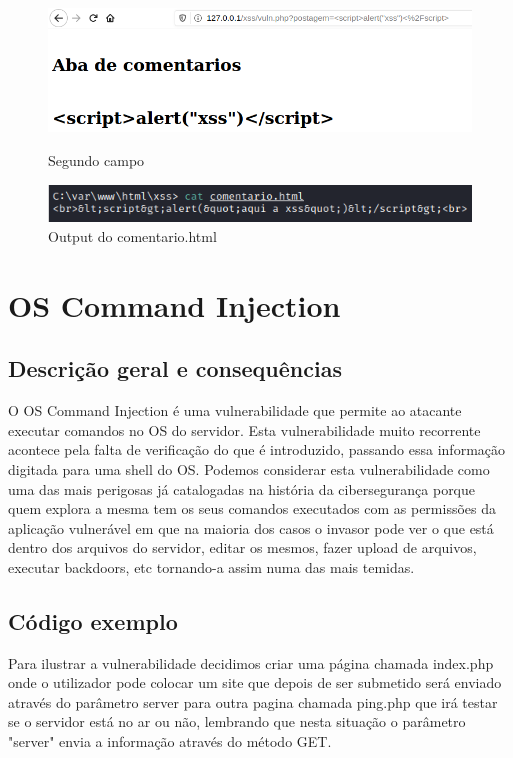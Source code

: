 \documentclass{report}
\begin{document}
\begin{figure}[!htb]
  \includegraphics[width=\linewidth]{imagessql/Fig17.png}
  \caption{Segundo campo}\label{Segundo campo}
\endminipage\hfill
{}
  \includegraphics[width=\linewidth]{imagessql/Fig18.png}
  \caption{Output do comentario.html}\label{Output do comentario.html}
\endminipage
\end{figure}


\clearpage
\section{OS Command Injection}


\subsection{Descrição geral e consequências}

O OS Command Injection é uma vulnerabilidade que permite ao atacante executar comandos no OS do servidor. Esta vulnerabilidade muito recorrente acontece pela falta de verificação do que é introduzido, passando essa informação digitada para uma shell do OS. Podemos considerar esta vulnerabilidade como uma das mais perigosas já catalogadas na história da cibersegurança porque quem explora a mesma tem os seus comandos executados com as permissões da aplicação vulnerável em que na maioria dos casos o invasor pode ver o que está dentro dos arquivos do servidor, editar os mesmos, fazer upload de arquivos, executar backdoors, etc tornando-a assim numa das mais temidas.

\clearpage
\subsection{Código exemplo}

Para ilustrar a vulnerabilidade decidimos criar uma página chamada index.php onde o utilizador pode colocar um site que depois de ser submetido será enviado através do parâmetro server para outra pagina chamada ping.php que irá testar se o servidor está no ar ou não, lembrando que nesta situação o parâmetro "server" envia a informação através do método GET.
\end{document}

